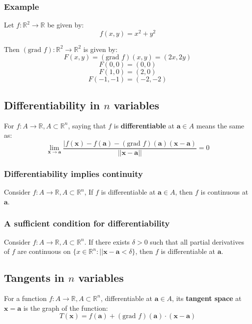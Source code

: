\documentclass[11pt]{article}
\begin{document}
\subsubsection{Example}
\label{sec:orgd1d5201}
Let \(f : \mathbb{R}^2 \rightarrow \mathbb{R}\) be given by:
\[f(x, y) = x^2 + y^2\]

Then \((\text{grad } f) : \mathbb{R}^2 \rightarrow \mathbb{R}^2\) is given by:
\[F(x, y) = (\text{grad } f)(x, y) = (2x, 2y)\]
\[F(0, 0) = (0, 0)\]
\[F(1, 0) = (2, 0)\]
\[F(-1, -1) = (-2, -2)\]

\subsection{Differentiability in \(n\) variables}
\label{sec:org5f50188}
For \(f : A \rightarrow \mathbb{R}, A \subset \mathbb{R}^n\), saying that \(f\) is \textbf{differentiable} at \(\boldsymbol{a} \in A\) means the same as:
\[\lim_{\boldsymbol{x} \rightarrow \boldsymbol{a}} \frac{|f(\boldsymbol{x}) - f(\boldsymbol{a}) - (\text{grad } f)(\boldsymbol{a})(\boldsymbol{x} - \boldsymbol{a})}{||\boldsymbol{x} - \boldsymbol{a}||} = 0\]

\subsubsection{Differentiability implies continuity}
\label{sec:org1b896ef}
Consider \(f : A \rightarrow \mathbb{R}, A \subset \mathbb{R}^n\), If \(f\) is differentiable at \(\boldsymbol{a} \in A\), then \(f\) is continuous at \(\boldsymbol{a}\).

\subsubsection{A sufficient condition for differentiability}
\label{sec:org64de1b7}
Consider \(f : A \rightarrow \mathbb{R}, A \subset \mathbb{R}^n\). If there exists \(\delta > 0\) such that all partial derivatives of \(f\) are continuous on \(\{x \in \mathbb{R}^n: ||\boldsymbol{x} - \boldsymbol{a} < \delta\}\), then \(f\) is differentiable at \(\boldsymbol{a}\).


\subsection{Tangents in \(n\) variables}
\label{sec:org0ec5c3c}
For a function \(f : A \rightarrow \mathbb{R}, A \subset \mathbb{R}^n\), differentiable at \(\boldsymbol{a} \in A\), its \textbf{tangent space} at \(\boldsymbol{x} = \boldsymbol{a}\) is the graph of the function:
\[T(\boldsymbol{x}) = f(\boldsymbol{a}) + (\text{grad } f)(\boldsymbol{a}) \cdot (\boldsymbol{x} - \boldsymbol{a})\]
\end{document}
